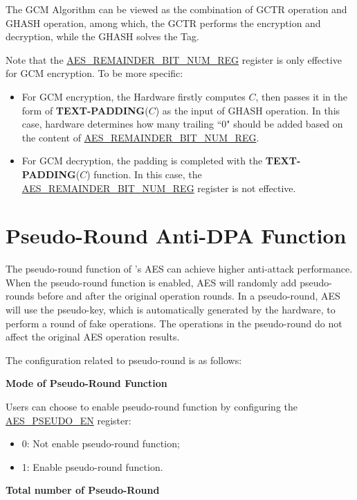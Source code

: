 \documentclass[main\_\_EN.tex]{subfiles}
\begin{document}
The GCM Algorithm can be viewed as the combination of GCTR operation and GHASH operation, among which, the GCTR performs the encryption and decryption, while the GHASH solves the Tag.

Note that the \hyperref[regdesc:AESREMAINDERBITNUMREG]{AES\_REMAINDER\_BIT\_NUM\_REG} register is only effective for GCM encryption. To be more specific:

\begin{itemize}
    \item For GCM encryption, the Hardware firstly computes $C$, then passes it in the form of {\bfseries TEXT-PADDING}($C$) as the input of GHASH operation. In this case, hardware determines how many trailing ``0" should be added based on the content of \hyperref[regdesc:AESREMAINDERBITNUMREG]{AES\_REMAINDER\_BIT\_NUM\_REG}.
    \item For GCM decryption, the padding is completed with the {\bfseries TEXT-PADDING}($C$) function. In this case, the \hyperref[regdesc:AESREMAINDERBITNUMREG]{AES\_REMAINDER\_BIT\_NUM\_REG} register is not effective.
\end{itemize}


\section{Pseudo-Round Anti-DPA Function}


The pseudo-round function of \chipname{}'s AES can achieve higher anti-attack performance.
When the pseudo-round function is enabled, AES will randomly add pseudo-rounds before and after the original operation rounds. In a pseudo-round, AES will use the pseudo-key, which is automatically generated by the hardware, to perform a round of fake operations. The operations in the pseudo-round do not affect the original AES operation results.

The configuration related to pseudo-round is as follows:

\textbf{Mode of Pseudo-Round Function}

Users can choose to enable pseudo-round function by configuring the \hyperref[fielddesc:AESPSEUDOEN]{AES\_PSEUDO\_EN} register:
\begin{itemize}
    \item 0: Not enable pseudo-round function;
    \item 1: Enable pseudo-round function.
\end{itemize}

\textbf{Total number of Pseudo-Round}
\end{document}
